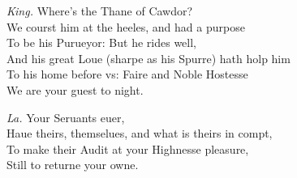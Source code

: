 \documentclass[12pt]{sides}
\newcommand{\dia}[1]{\hskip 15pt\textit{#1}\hskip 6pt}
\begin{document}
\begin{multicols}{2}
            \dia{King.} Where's the Thane of Cawdor? \\ We courst him at the heeles, and had a purpose \\ To be his Purueyor: But he rides well, \\ And his great Loue (sharpe as his Spurre) hath holp him \\ To his home before vs: Faire and Noble Hostesse \\ We are your guest to night.

            \dia{La.} Your Seruants euer, \\ Haue theirs, themselues, and what is theirs in compt, \\ To make their Audit at your Highnesse pleasure, \\ Still to returne your owne.


\end{multicols}
\end{document}

